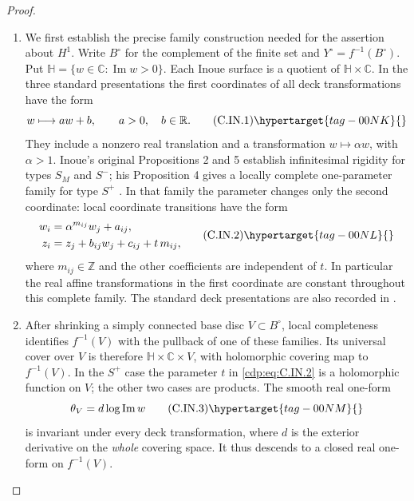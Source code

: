 \begin{proof}

\begin{enumerate}[label={$\langle1\rangle$\arabic*.},leftmargin=*]
\item We first establish the precise family construction needed for the
assertion about $H^1$. Write $B^\circ$ for the complement of the
finite set and $Y^\circ=f^{-1}(B^\circ)$. Put
$\mathbb H=\{w\in\mathbb C:\operatorname{Im}w>0\}$.
Each Inoue surface is a quotient of $\mathbb H\times\mathbb C$.
In the three standard presentations the first coordinates of all
deck transformations have the form
\[
 w\longmapsto a w+b,\qquad a>0,\quad b\in\mathbb R.
\tag{C.IN.1}\hypertarget{tag-00NK}{}\label{cdp:eq:C.IN.1}
\]
They include a nonzero real translation and a transformation
$w\mapsto\alpha w$, with $\alpha>1$. Inoue's original
Propositions 2 and 5 establish infinitesimal rigidity for types
$S_M$ and $S^{-}$; his Proposition 4 gives a locally complete
one-parameter family for type $S^{+}$
\cite[pp.~274, 278, 280]{Inoue1974}.
In that family the parameter changes only the second coordinate:
local coordinate transitions have the form
\[
\begin{aligned}
 w_i&=\alpha^{m_{ij}}w_j+a_{ij},\\
 z_i&=z_j+b_{ij}w_j+c_{ij}+t\,m_{ij},
\end{aligned}
\tag{C.IN.2}\hypertarget{tag-00NL}{}\label{cdp:eq:C.IN.2}
\]
where $m_{ij}\in\mathbb Z$ and the other coefficients are
independent of $t$. In particular the real affine transformations
in the first coordinate are constant throughout this complete
family. The standard deck presentations are also recorded in
\cite[Sections 2.1--2.3]{KhaledTeleman2026}.

\item After shrinking a simply connected base disc $V\subset B^\circ$,
local completeness identifies $f^{-1}(V)$ with the pullback of one
of these families. Its universal cover over $V$ is therefore
$\mathbb H\times\mathbb C\times V$, with holomorphic covering
map to $f^{-1}(V)$. In the $S^{+}$ case the parameter $t$ in
\eqref{cdp:eq:C.IN.2} is a holomorphic function on $V$; the other two cases
are products. The smooth real one-form
\[
 \theta_V=d\log\operatorname{Im}w
\tag{C.IN.3}\hypertarget{tag-00NM}{}\label{cdp:eq:C.IN.3}
\]
is invariant under every deck transformation, where $d$ is the
exterior derivative on the \emph{whole} covering space. It thus
descends to a closed real one-form on $f^{-1}(V)$.


\end{enumerate}
\end{proof}
